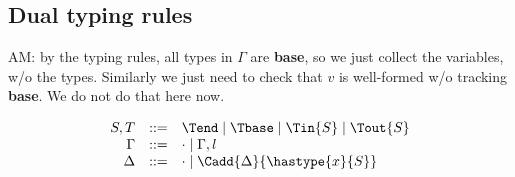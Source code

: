 \subsection{Dual typing rules}
\renewcommand{\Cempty}{\cdot}
\renewcommand{\Csplit}[2]{#1,  #2}
\renewcommand{\Cupdate}[2]{#1, #2}
\newcommand{\TinV}[2]{{?#1}.#2}
\newcommand{\ToutV}[2]{{!#1}.#2}
\newcommand{\tend}[1]{\mathbf{end}(#1)}

\begin{metanote}
  AM: by the typing rules, all types in $\Gamma$ are \textbf{base}, so we  just collect the variables, w/o the types. Similarly we just need to check that $v$ is well-formed w/o tracking \textbf{base}. We do not do that here now. %
\end{metanote}

\[
  \begin{array}{rcl}
  S,T & ::= & \Tend \mid \Tbase \mid \Tin{S} \mid \Tout{S} \\
    \Gamma &::= & \Cempty \mid \Gamma, l \\
                    \Delta &::= & \Cempty \mid \Cadd{\Delta}{\hastype{x}{S}}
     \end{array}
\]


